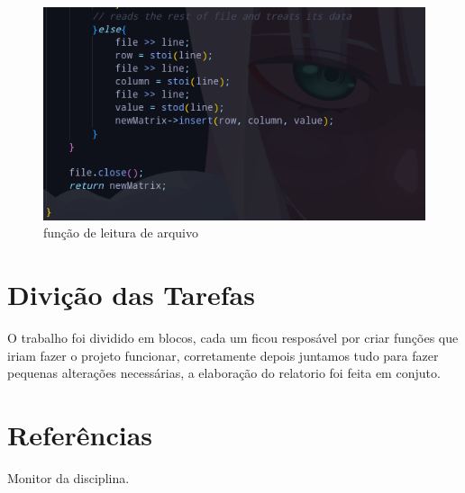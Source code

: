 \documentclass[a4paper,12pt]{article}
\begin{document}
\begin{figure}[H]
\centering
\includegraphics[width=1\textwidth]{Imagens/main/read-sparsematrix-pt2.png}
\caption{\label{fig:read} função de leitura de arquivo}

\end{figure}
 
 
 \section{Divição das Tarefas }
 
  O trabalho foi dividido em blocos, cada um ficou resposável por criar funções que iriam fazer o projeto funcionar, corretamente depois juntamos tudo para fazer pequenas alterações necessárias, a elaboração do relatorio foi feita em conjuto.

\section{Referências}

Monitor da disciplina.
\end{document}
